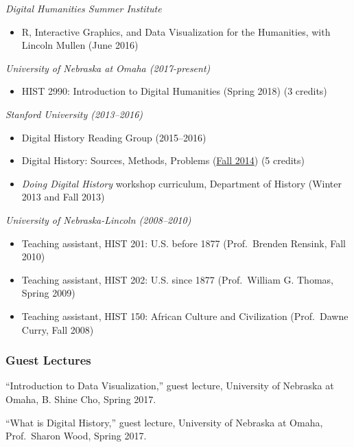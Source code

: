 \emph{Digital Humanities Summer Institute}

\begin{itemize}
\tightlist
\item
  R, Interactive Graphics, and Data Visualization for the Humanities,
  with Lincoln Mullen (June 2016)
\end{itemize}

\emph{University of Nebraska at Omaha (2017-present)}

\begin{itemize}
\tightlist
\item
  HIST 2990: Introduction to Digital Humanities (Spring 2018) (3
  credits)
\end{itemize}

\emph{Stanford University (2013--2016)}

\begin{itemize}
\tightlist
\item
  Digital History Reading Group (2015--2016)
\item
  Digital History: Sources, Methods, Problems
  (\href{http://jasonheppler.org/teaching/hist205f.2014/}{Fall 2014}) (5
  credits)
\item
  \emph{Doing Digital History} workshop curriculum, Department of
  History (Winter 2013 and Fall 2013)
\end{itemize}

\emph{University of Nebraska-Lincoln (2008--2010)}

\begin{itemize}
\tightlist
\item
  Teaching assistant, HIST 201: U.S. before 1877 (Prof.~Brenden Rensink,
  Fall 2010)
\item
  Teaching assistant, HIST 202: U.S. since 1877 (Prof.~William G.
  Thomas, Spring 2009)
\item
  Teaching assistant, HIST 150: African Culture and Civilization
  (Prof.~Dawne Curry, Fall 2008)
\end{itemize}

\subsubsection{Guest Lectures}\label{guest-lectures}

``Introduction to Data Visualization,'' guest lecture, University of
Nebraska at Omaha, B. Shine Cho, Spring 2017.

``What is Digital History,'' guest lecture, University of Nebraska at
Omaha, Prof.~Sharon Wood, Spring 2017.

